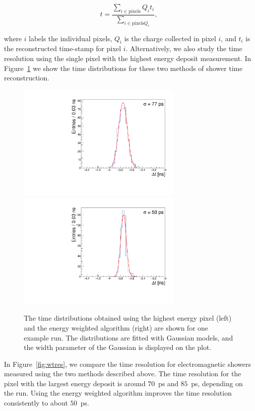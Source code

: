 \begin{equation} t =\frac{\sum_{i\in\mathrm{pixels}} Q_{i} t_{i}}
{\sum_{i\in\mathrm{pixels} Q_{i}}}, 
\label{eqn:EnergyWeightedTimestamp}
\end{equation} 

where $i$ labels the individual pixels, $Q_{i}$ is the charge
collected in pixel $i$, and $t_{i}$ is the reconstructed time-stamp for pixel
$i$. Alternatively, we also study the time resolution using the single pixel
with the highest energy deposit measurement. In Figure~\ref{fig:exdt} we show
the time distributions for these two methods of shower time reconstruction.

\begin{figure}[htbp] 
\centering
\includegraphics[width=8cm]{Images/exdt/exdtHI.pdf}
\includegraphics[width=8cm]{Images/exdt/exdtWI.pdf} 
\caption{\small The time distributions obtained using the highest energy pixel (left) and the energy weighted algorithm (right) are shown for one example run. The distributions are
fitted with Gaussian models, and the width parameter of the Gaussian is
displayed on the plot.} 
\label{fig:exdt} 
\end{figure} 

In Figure~\ref{fig:wtres}, we compare the time resolution for electromagnetic
showers measured using the two methods described above. The time resolution for
the pixel with the largest energy deposit is around $70$~ps and $85$~ps,
depending on the run. Using the energy weighted algorithm improves the time
resolution consistently to about $50$~ps. 

